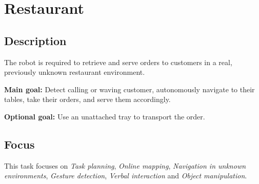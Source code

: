 \section{Restaurant}\label{test:restaurant}

\subsection*{Description}

The robot is required to retrieve and serve orders to customers in a real, previously unknown restaurant environment.

\textbf{Main goal:}
	Detect calling or waving customer, autonomously navigate to their tables, take their orders, and serve them accordingly.
	
\textbf{Optional goal:}
	Use an unattached tray to transport the order.


\subsection*{Focus}
This task focuses on
\emph{Task planning}, \emph{Online mapping}, \emph{Navigation in unknown  environments}, \emph{Gesture detection}, \emph{Verbal interaction} and \emph{Object manipulation}.	

